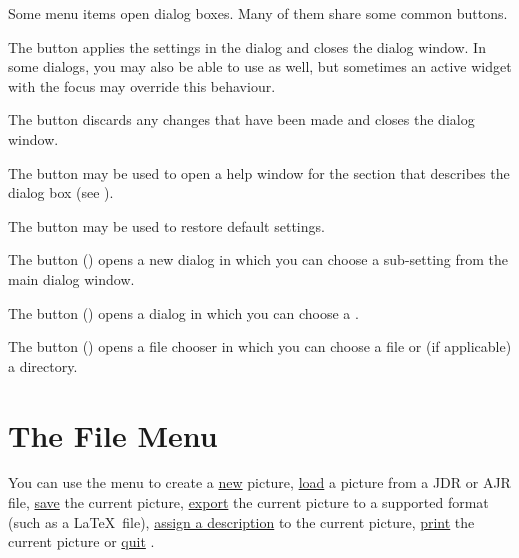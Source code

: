 Some menu items open dialog boxes. Many of them share some common
buttons.


The  button applies the settings in the dialog and
closes the dialog window. In some dialogs, you may also be able to
use  as well, but sometimes an
active widget with the focus may override this behaviour.


The  button discards any changes that have been made
and closes the dialog window.


The  button may be used to open a help
window for the section that describes the dialog box (see
).


The  button may be used to restore default
settings.


The  button () opens a new dialog in which you
can choose a sub-setting from the main dialog window.


The  button () opens
a dialog in which you can choose a .


The  button () opens a file chooser in
which you can choose a file or (if applicable) a directory.

\chapter{The File Menu}\label{sec:filemenu}


You can use the  menu to create a
\hyperref[sec:newimage]{new} picture,
\hyperref[sec:loadimage]{load} a picture from a
\gls{JDR} or \gls{AJR} file,
\hyperref[sec:saveimage]{save} the current picture,
\hyperref[sec:exportimage]{export} the current
picture to a supported format (such as a \LaTeX\ file),
\hyperref[sec:imagedescription]{assign a description} to the
current picture, \hyperref[sec:print]{print} the
current picture or \hyperref[sec:quit]{quit} \FlowframTk.

